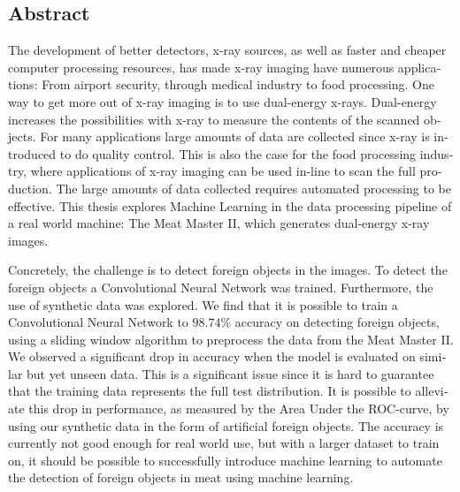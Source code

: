 
\begin{otherlanguage}{american}
\section*{Abstract}
The development of better detectors, x-ray sources, as well as faster and cheaper computer processing resources, has made x-ray imaging have numerous applications: From airport security, through medical industry to food processing.
One way to get more out of x-ray imaging is to use dual-energy x-rays.
Dual-energy increases the possibilities with x-ray to measure the contents of the scanned objects. 
For many applications large amounts of data are collected since x-ray is introduced to do quality control.
This is also the case for the food processing industry, where applications of x-ray imaging can be used in-line to scan the full production.
The large amounts of data collected requires automated processing to be effective.
This thesis explores Machine Learning in the data processing pipeline of a real world machine: The Meat Master II, which generates dual-energy x-ray images.

Concretely, the challenge is to detect foreign objects in the images.
To detect the foreign objects a Convolutional Neural Network was trained.
Furthermore, the use of synthetic data was explored.
We find that it is possible to train a Convolutional Neural Network to $98.74\%$ accuracy on detecting foreign objects, using a sliding window algorithm to preprocess the data from the Meat Master II.
We observed a significant drop in accuracy when the model is evaluated on similar but yet unseen data. 
This is a significant issue since it is hard to guarantee that the training data represents the full test distribution.
It is possible to alleviate this drop in performance, as measured by the Area Under the ROC-curve, by using our synthetic data in the form of artificial foreign objects.
The accuracy is currently not good enough for real world use, but with a larger dataset to train on, it should be possible to successfully introduce machine learning to automate the detection of foreign objects in meat using machine learning.
\end{otherlanguage}
\clearpage